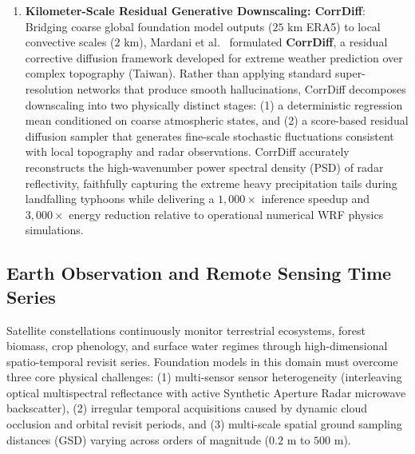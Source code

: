 \begin{enumerate}
    \item \textbf{Kilometer-Scale Residual Generative Downscaling: CorrDiff}: Bridging coarse global foundation model outputs ($25\text{ km}$ ERA5) to local convective scales ($2\text{ km}$), Mardani et al.~\cite{mardani2023corrdiff} formulated \textbf{CorrDiff}, a residual corrective diffusion framework developed for extreme weather prediction over complex topography (Taiwan). Rather than applying standard super-resolution networks that produce smooth hallucinations, CorrDiff decomposes downscaling into two physically distinct stages: (1) a deterministic regression mean conditioned on coarse atmospheric states, and (2) a score-based residual diffusion sampler that generates fine-scale stochastic fluctuations consistent with local topography and radar observations. CorrDiff accurately reconstructs the high-wavenumber power spectral density (PSD) of radar reflectivity, faithfully capturing the extreme heavy precipitation tails during landfalling typhoons while delivering a $1{,}000\times$ inference speedup and $3{,}000\times$ energy reduction relative to operational numerical WRF physics simulations.
\end{enumerate}

\subsection{Earth Observation and Remote Sensing Time Series}
Satellite constellations continuously monitor terrestrial ecosystems, forest biomass, crop phenology, and surface water regimes through high-dimensional spatio-temporal revisit series. Foundation models in this domain must overcome three core physical challenges: (1) multi-sensor sensor heterogeneity (interleaving optical multispectral reflectance with active Synthetic Aperture Radar microwave backscatter), (2) irregular temporal acquisitions caused by dynamic cloud occlusion and orbital revisit periods, and (3) multi-scale spatial ground sampling distances (GSD) varying across orders of magnitude ($0.2\text{ m}$ to $500\text{ m}$).

